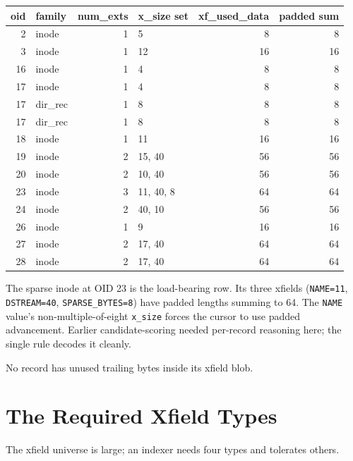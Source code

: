 \begin{center}
\begin{tabular}{rlrlrr}
\toprule
oid & family & num\_exts & x\_size set & xf\_used\_data & padded sum \\
\midrule
2  & inode   & 1 & 5                 & 8  & 8 \\
3  & inode   & 1 & 12                & 16 & 16 \\
16 & inode   & 1 & 4                 & 8  & 8 \\
17 & inode   & 1 & 4                 & 8  & 8 \\
17 & dir\_rec & 1 & 8                & 8  & 8 \\
17 & dir\_rec & 1 & 8                & 8  & 8 \\
18 & inode   & 1 & 11                & 16 & 16 \\
19 & inode   & 2 & 15, 40            & 56 & 56 \\
20 & inode   & 2 & 10, 40            & 56 & 56 \\
23 & inode   & 3 & 11, 40, 8         & 64 & 64 \\
24 & inode   & 2 & 40, 10            & 56 & 56 \\
26 & inode   & 1 & 9                 & 16 & 16 \\
27 & inode   & 2 & 17, 40            & 64 & 64 \\
28 & inode   & 2 & 17, 40            & 64 & 64 \\
\bottomrule
\end{tabular}
\end{center}

The sparse inode at OID 23 is the load-bearing row. Its three
xfields (\texttt{NAME=11}, \texttt{DSTREAM=40},
\texttt{SPARSE\_BYTES=8}) have padded lengths summing to 64. The
\texttt{NAME} value's non-multiple-of-eight \texttt{x\_size}
forces the cursor to use padded advancement. Earlier
candidate-scoring needed per-record reasoning here; the single
rule decodes it cleanly.

No record has unused trailing bytes inside its xfield blob.

\section{The Required Xfield Types}

The xfield universe is large; an indexer needs four types and
tolerates others.

